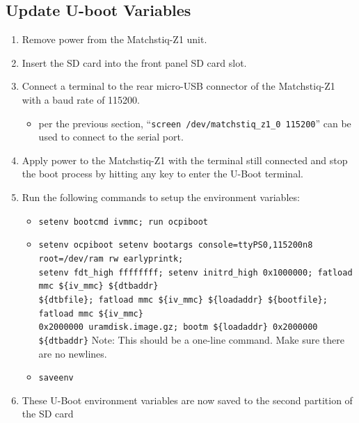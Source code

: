 \subsection{Update U-boot Variables}
\begin{enumerate}
\item Remove power from the Matchstiq-Z1 unit.
\item Insert the SD card into the front panel SD card slot.
\item Connect a terminal to the rear micro-USB connector of the Matchstiq-Z1 with a baud rate of 115200.
\begin{itemize}
\item per the previous section, ``\texttt{screen /dev/matchstiq\_z1\_0 115200}'' can be used to connect to the serial port.
\end{itemize}
\item Apply power to the Matchstiq-Z1 with the terminal still connected and stop the boot process by hitting any key to enter the U-Boot terminal.
\item Run the following commands to setup the environment variables:
\begin{itemize}
\item \texttt{setenv bootcmd \textquotesingle ivmmc; run ocpiboot\textquotesingle}
\item \texttt{setenv ocpiboot \textquotesingle setenv bootargs console=ttyPS0,115200n8 root=/dev/ram rw earlyprintk; \\
setenv fdt\_high ffffffff; setenv initrd\_high 0x1000000; fatload mmc \$\{iv\_mmc\} \$\{dtbaddr\}\\
\$\{dtbfile\}; fatload mmc \$\{iv\_mmc\} \$\{loadaddr\} \$\{bootfile\}; fatload mmc \$\{iv\_mmc\}\\
0x2000000 uramdisk.image.gz; bootm \$\{loadaddr\} 0x2000000 \$\{dtbaddr\}\textquotesingle}
\subitem *Note: This should be a one-line command. Make sure there are no newlines.
\item \texttt{saveenv}
\end{itemize}
\item These U-Boot environment variables are now saved to the second partition of the SD card
\end{enumerate}


